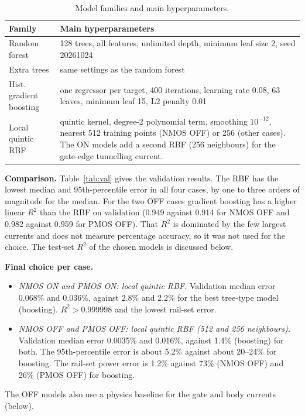 \begin{table}[H]
\centering\small
\caption{Model families and main hyperparameters.}
\label{tab:hyper}
\begin{tabular}{lp{11cm}}
\toprule
Family & Main hyperparameters \\
\midrule
Random forest & 128 trees, all features, unlimited depth, minimum leaf size 2, seed 20261024 \\
Extra trees & same settings as the random forest \\
Hist. gradient boosting & one regressor per target, 400 iterations, learning rate 0.08, 63 leaves, minimum leaf 15, L2 penalty 0.01 \\
Local quintic RBF & quintic kernel, degree-2 polynomial term, smoothing $10^{-12}$, nearest 512 training points (NMOS OFF) or 256 (other cases). The ON models add a second RBF (256 neighbours) for the gate-edge tunnelling current. \\
\bottomrule
\end{tabular}
\end{table}

\textbf{Comparison.} Table~\ref{tab:val} gives the validation results. The RBF has the lowest median and 95th-percentile error in all four cases, by one to three orders of magnitude for the median. For the two OFF cases gradient boosting has a higher linear $R^2$ than the RBF on validation (0.949 against 0.914 for NMOS OFF and 0.982 against 0.959 for PMOS OFF). That $R^2$ is dominated by the few largest currents and does not measure percentage accuracy, so it was not used for the choice. The test-set $R^2$ of the chosen models is discussed below.



\textbf{Final choice per case.}
\begin{itemize}
\item \emph{NMOS ON and PMOS ON: local quintic RBF.} Validation median error 0.068\% and 0.036\%, against 2.8\% and 2.2\% for the best tree-type model (boosting). $R^2>0.999998$ and the lowest rail-set error.
\item \emph{NMOS OFF and PMOS OFF: local quintic RBF (512 and 256 neighbours).} Validation median error 0.0035\% and 0.016\%, against 1.4\% (boosting) for both. The 95th-percentile error is about 5.2\% against about 20--24\% for boosting. The rail-set power error is 1.2\% against 73\% (NMOS OFF) and 26\% (PMOS OFF) for boosting.
\end{itemize}
The OFF models also use a physics baseline for the gate and body currents (below).


